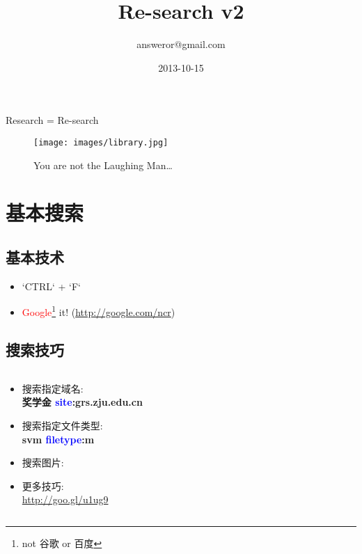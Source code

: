 \documentclass[compress]{beamer}
\title{Re-search v2}
\author{answeror@gmail.com}
\date{2013-10-15}
\begin{document}
\frame{\titlepage}

\begin{frame}{Research = Re-search}
    \begin{figure}
        \centering
        \texttt{[image: images/library.jpg]}
        \caption{You are not the Laughing Man\ldots}
    \end{figure}
\end{frame}

\section{基本搜索}

\subsection{基本技术}

\begin{frame}{\insertsubsection}
    \begin{itemize}[<+->]
        \item `CTRL` + `F`
        \item \textcolor{red}{Google}\footnote{not 谷歌 or 百度} it! (\url{http://google.com/ncr})
    \end{itemize}
\end{frame}

\subsection{搜索技巧}

\begin{frame}{\insertsubsection}
    \begin{columns}[T]
        \begin{column}{0.5\textwidth}
            \begin{itemize}[<+->]
                \item 搜索指定域名: \\ \vspace{0.1cm} \textbf{奖学金 \textcolor{blue}{site}:grs.zju.edu.cn}
                \item 搜索指定文件类型: \\ \vspace{0.1cm} \textbf{svm \textcolor{blue}{filetype}:m}
                \item 搜索图片:
                \item 更多技巧: \\ \vspace{0.1cm} \url{http://goo.gl/u1ug9}
            \end{itemize}
        \end{column}
        \begin{column}{0.5\textwidth}
        \end{column}
    \end{columns}
\end{frame}
\end{document}

